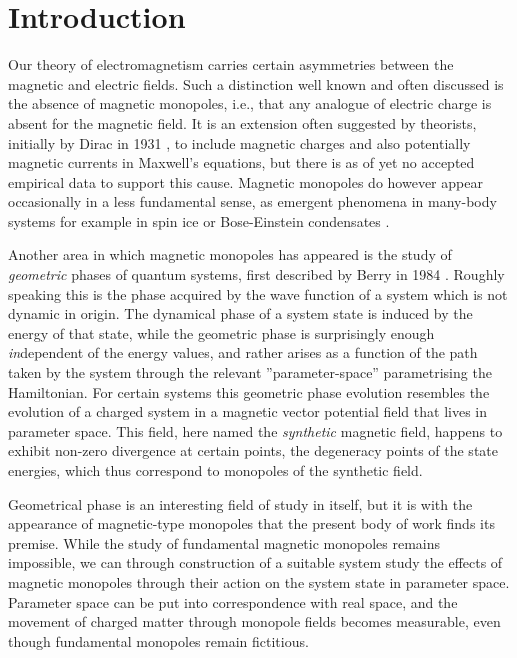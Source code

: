 \documentclass[main.tex]{subfiles}
\begin{document}
\section{Introduction}
\label{sec:introduction}
Our theory of electromagnetism carries certain asymmetries between the magnetic and
electric fields. Such a distinction well known and often discussed is the absence of
magnetic monopoles, i.e., that
any analogue of electric charge is absent for the magnetic field. It is an extension often
suggested by theorists, initially by Dirac in 1931 \cite{dirac}, to include magnetic
charges and also potentially magnetic currents in Maxwell's equations, but
there is as of yet no accepted empirical data to support this cause. Magnetic monopoles do
however appear occasionally in a less fundamental sense, as emergent phenomena in
many-body systems for example in
spin ice \cite{castelnovo} or Bose-Einstein condensates \cite{ray}. 

Another area in which magnetic monopoles has appeared is the study of \textit{geometric}
phases of quantum systems, first described by Berry in 1984 \cite{berry1984}. Roughly
speaking this is the phase acquired by the wave function of a system which is not dynamic
in origin. The dynamical phase of a system state is induced by the energy of that state,
while the geometric phase is surprisingly enough \textit{in}dependent of the energy values,
and rather arises as a function of the path taken by the system through the relevant
''parameter-space'' parametrising the Hamiltonian. For certain systems this geometric phase evolution
resembles the %
evolution of a charged system in a magnetic vector potential field that lives in 
parameter space. This field, here named the \textit{synthetic} magnetic field, happens to
exhibit non-zero divergence at certain points, the degeneracy points of the state energies,
which thus correspond to monopoles of the synthetic field.

Geometrical phase is an interesting field of study in itself, but it is with the
appearance of magnetic-type monopoles that the present body of work finds its premise.
While the study of fundamental magnetic monopoles remains impossible, we can through construction of
a suitable system study the effects of magnetic monopoles through their action on the
system state in parameter space. Parameter space can be put into correspondence with real
space, and the movement of charged matter through monopole fields
becomes measurable, even though fundamental monopoles remain fictitious.
\end{document}
